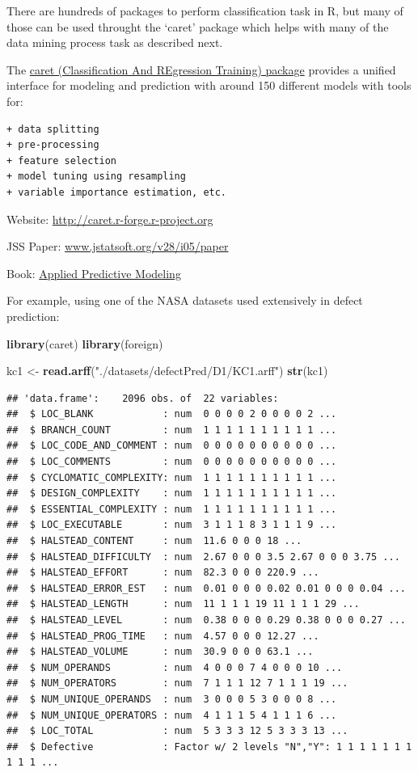 \documentclass[]{book}
\newenvironment{Shaded}{\begin{snugshade}}{\end{snugshade}}
\newcommand{\KeywordTok}[1]{\textcolor[rgb]{0.13,0.29,0.53}{\textbf{{#1}}}}
\newcommand{\StringTok}[1]{\textcolor[rgb]{0.31,0.60,0.02}{{#1}}}
\newcommand{\NormalTok}[1]{{#1}}
\begin{document}
There are hundreds of packages to perform classification task in R, but
many of those can be used throught the `caret' package which helps with
many of the data mining process task as described next.

The \href{http://topepo.github.io/caret/}{caret (Classification And
REgression Training) package} provides a unified interface for modeling
and prediction with around 150 different models with tools for:

\begin{verbatim}
+ data splitting
+ pre-processing
+ feature selection
+ model tuning using resampling
+ variable importance estimation, etc.
\end{verbatim}

Website: \url{http://caret.r-forge.r-project.org}

JSS Paper: \url{www.jstatsoft.org/v28/i05/paper}

Book: \href{http://AppliedPredictiveModeling.com/}{Applied Predictive
Modeling}

For example, using one of the NASA datasets used extensively in defect
prediction:

\begin{Shaded}
\begin{Highlighting}[]
\KeywordTok{library}\NormalTok{(caret)}
\KeywordTok{library}\NormalTok{(foreign)}

\NormalTok{kc1 <-}\StringTok{ }\KeywordTok{read.arff}\NormalTok{(}\StringTok{"./datasets/defectPred/D1/KC1.arff"}\NormalTok{)}
\KeywordTok{str}\NormalTok{(kc1)}
\end{Highlighting}
\end{Shaded}

\begin{verbatim}
## 'data.frame':    2096 obs. of  22 variables:
##  $ LOC_BLANK            : num  0 0 0 0 2 0 0 0 0 2 ...
##  $ BRANCH_COUNT         : num  1 1 1 1 1 1 1 1 1 1 ...
##  $ LOC_CODE_AND_COMMENT : num  0 0 0 0 0 0 0 0 0 0 ...
##  $ LOC_COMMENTS         : num  0 0 0 0 0 0 0 0 0 0 ...
##  $ CYCLOMATIC_COMPLEXITY: num  1 1 1 1 1 1 1 1 1 1 ...
##  $ DESIGN_COMPLEXITY    : num  1 1 1 1 1 1 1 1 1 1 ...
##  $ ESSENTIAL_COMPLEXITY : num  1 1 1 1 1 1 1 1 1 1 ...
##  $ LOC_EXECUTABLE       : num  3 1 1 1 8 3 1 1 1 9 ...
##  $ HALSTEAD_CONTENT     : num  11.6 0 0 0 18 ...
##  $ HALSTEAD_DIFFICULTY  : num  2.67 0 0 0 3.5 2.67 0 0 0 3.75 ...
##  $ HALSTEAD_EFFORT      : num  82.3 0 0 0 220.9 ...
##  $ HALSTEAD_ERROR_EST   : num  0.01 0 0 0 0.02 0.01 0 0 0 0.04 ...
##  $ HALSTEAD_LENGTH      : num  11 1 1 1 19 11 1 1 1 29 ...
##  $ HALSTEAD_LEVEL       : num  0.38 0 0 0 0.29 0.38 0 0 0 0.27 ...
##  $ HALSTEAD_PROG_TIME   : num  4.57 0 0 0 12.27 ...
##  $ HALSTEAD_VOLUME      : num  30.9 0 0 0 63.1 ...
##  $ NUM_OPERANDS         : num  4 0 0 0 7 4 0 0 0 10 ...
##  $ NUM_OPERATORS        : num  7 1 1 1 12 7 1 1 1 19 ...
##  $ NUM_UNIQUE_OPERANDS  : num  3 0 0 0 5 3 0 0 0 8 ...
##  $ NUM_UNIQUE_OPERATORS : num  4 1 1 1 5 4 1 1 1 6 ...
##  $ LOC_TOTAL            : num  5 3 3 3 12 5 3 3 3 13 ...
##  $ Defective            : Factor w/ 2 levels "N","Y": 1 1 1 1 1 1 1 1 1 1 ...
\end{verbatim}
\end{document}
